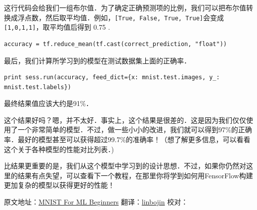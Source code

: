 这行代码会给我们一组布尔值．为了确定正确预测项的比例，我们可以把布尔值转换成浮点数，然后取平均值．例如，\lstinline{[True, False, True, True]}会变成\lstinline{[1,0,1,1]}，取平均值后得到 0.75 .

\begin{lstlisting}
accuracy = tf.reduce_mean(tf.cast(correct_prediction, "float"))
\end{lstlisting}

最后，我们计算所学习到的模型在测试数据集上面的正确率．

\begin{lstlisting}
print sess.run(accuracy, feed_dict={x: mnist.test.images, y_: mnist.test.labels})
\end{lstlisting}

最终结果值应该大约是91\%．

这个结果好吗？嗯，并不太好．事实上，这个结果是很差的．这是因为我们仅仅使用了一个非常简单的模型．不过，做一些小小的改进，我们就可以得到97\%的正确率．最好的模型甚至可以获得超过99.7\%的准确率！（想了解更多信息，可以看看这个关于各种模型的性能对比列表．)

比结果更重要的是，我们从这个模型中学习到的设计思想．不过，如果你仍然对这里的结果有点失望，可以查看下一个教程，在那里你将学到如何用FensorFlow构建更加复杂的模型以获得更好的性能！

原文地址：\href{http://tensorflow.org/tutorials/mnist/beginners/index.md}{MNIST For ML Beginners}
翻译：\href{https://github.com/linbojin}{linbojin} 校对：
